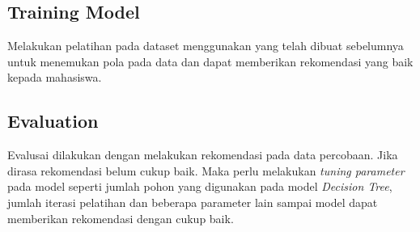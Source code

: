 \subsection{Training Model}
Melakukan pelatihan pada dataset menggunakan yang telah dibuat sebelumnya untuk menemukan pola pada data dan dapat memberikan rekomendasi yang baik kepada mahasiswa.

\subsection{Evaluation}
Evalusai dilakukan dengan melakukan rekomendasi pada data percobaan. Jika dirasa rekomendasi belum cukup baik. Maka perlu melakukan
\emph{tuning parameter} pada model seperti jumlah pohon yang digunakan pada model \emph{Decision Tree}, jumlah iterasi pelatihan dan
beberapa parameter lain sampai model dapat memberikan rekomendasi dengan cukup baik.

